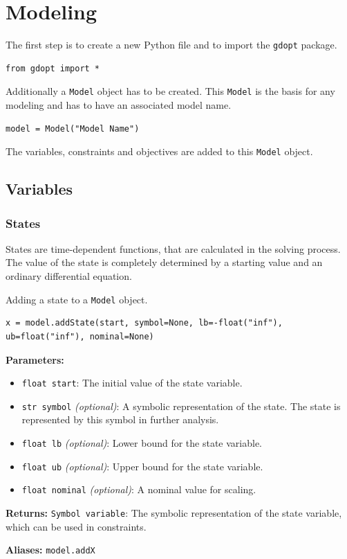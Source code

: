 \documentclass[12pt]{article}
\begin{document}
\section{Modeling}

The first step is to create a new Python file and to import the
\texttt{gdopt} package.
\begin{lstlisting}
from gdopt import *
	\end{lstlisting}

Additionally a \texttt{Model} object has to be created. This
\texttt{Model} is the basis for any modeling and has to have an associated
model name.
\begin{lstlisting}
model = Model("Model Name")
	\end{lstlisting}

The variables, constraints and objectives are added to this
\texttt{Model} object.

\subsection{Variables}

\subsubsection{States}

States are time-dependent functions, that are calculated in the
solving process. The value of the state is completely determined by a starting
value and an ordinary differential equation.

\begin{mdframed}[backgroundcolor=gray!10, roundcorner=10pt, linewidth=1pt]

	Adding a state to a \texttt{Model} object.

	\begin{lstlisting}
x = model.addState(start, symbol=None, lb=-float("inf"), ub=float("inf"), nominal=None)
	\end{lstlisting}\label{addState}

	\textbf{Parameters:}
	\begin{itemize}
		\item \texttt{float start}: The initial value of the state
		      variable.
		\item \texttt{str symbol} \emph{(optional)}: A symbolic
		      representation of the state. The state is
		      represented by this symbol in
		      further analysis.
		\item \texttt{float lb} \emph{(optional)}: Lower bound for the
		      state variable.
		\item \texttt{float ub} \emph{(optional)}: Upper bound for the
		      state variable.
		\item \texttt{float nominal} \emph{(optional)}: A nominal value
		      for scaling.
	\end{itemize}

	\textbf{Returns:}
	\texttt{Symbol variable}: The symbolic representation of the state
	variable, which can be used in constraints.

	\textbf{Aliases:} \texttt{model.addX}
\end{mdframed}
\end{document}
